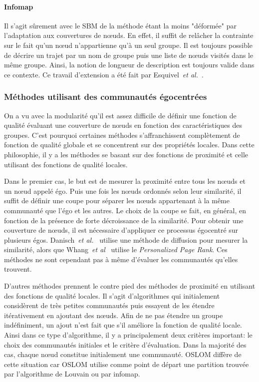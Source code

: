 \paragraph{Infomap}
Il s'agit sûrement avec le SBM de la méthode étant la moins "déformée" par l'adaptation aux couvertures de n\oe uds.
En effet, il suffit de relâcher la contrainte sur le fait qu'un n\oe ud n'appartienne qu'à un seul groupe.
Il est toujours possible de décrire un trajet par un nom de groupe puis une liste de n\oe uds visités dans le même groupe.
Ainsi, la notion de longueur de description est toujours valide dans ce contexte.
Ce travail d'extension a été fait par Esquivel~\emph{et al.}~\cite{Esquivel2011}.

\subsubsection{Méthodes utilisant des communautés égocentrées}
On a vu avec la modularité qu'il est assez difficile de définir une fonction de qualité évaluant une couverture de n\oe uds en fonction des caractéristiques des groupes.
C'est pourquoi certaines méthodes s'affranchissent complètement de fonction de qualité globale et se concentrent sur des propriétés locales.
Dans cette philosophie, il y a les méthodes se basant sur des fonctions de proximité et celle utilisant des fonctions de qualité locales.

Dans le premier cas, le but est de mesurer la proximité entre tous les n\oe uds et un n\oe ud appelé égo.
Puis une fois les n\oe uds ordonnés selon leur similarité, il suffit de définir une coupe pour séparer les n\oe uds appartenant à la même communauté que l'égo et les autres.
Le choix de la coupe se fait, en général, en fonction de la présence de forte décroissance de la similarité.
Pour obtenir une couverture de n\oe uds, il est nécessaire d'appliquer ce processus égocentré sur plusieurs égos.
Danisch~\emph{et al.}~\cite{Danisch2012} utilise une méthode de diffusion pour mesurer la similarité, alors que Whang~\emph{et al}~\cite{Whang2013} utilise le \emph{Personalized Page Rank}.
Ces méthodes ne sont cependant pas à même d'évaluer les communautés qu'elles trouvent.
\bigskip

D'autres méthodes prennent le contre pied des méthodes de proximité en utilisant des fonctions de qualité locales.
Il s'agit d'algorithmes qui initialement considèrent de très petites communautés puis essayent de les étendre itérativement en ajoutant des n\oe uds.
Afin de ne pas étendre un groupe indéfiniment, un ajout n'est fait que s'il améliore la fonction de qualité locale.
Ainsi dans ce type d'algorithme, il y a principalement deux critères important:
le choix des communautés initiales et le critère d'évaluation.
Dans la majorité des cas, chaque n\oe ud constitue initialement une communauté. 
OSLOM\cite{Lancichinetti2011a} diffère de cette situation car OSLOM utilise comme point de départ une partition trouvée par l'algorithme de Louvain ou par infomap.

